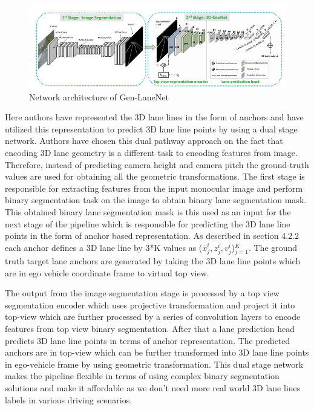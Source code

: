          \begin{figure}[h]
    \centering
    \includegraphics[width=13cm]{images/GenLaneNET.png}
    \caption{Network architecture of Gen-LaneNet \cite{guo2020gen}}
    \end{figure}
         
         Here authors have represented the 3D lane lines in the form of anchors and have utilized this representation to predict 3D lane line points by using a dual stage network. Authors have chosen this dual pathway approach on the fact that encoding 3D lane geometry is a different task to encoding features from image. Therefore, instead of predicting camera height and camera pitch the ground-truth values are used for obtaining all the geometric transformations. 
         The first stage is responsible for extracting features from the input monocular image and perform binary segmentation task on the image to obtain binary lane segmentation mask. This obtained binary lane segmentation mask is this used as an input for the next stage of the pipeline which is responsible for predicting the 3D lane line points in the form of anchor based representation. As described in section 4.2.2 each anchor defines a 3D lane line by 3*K values as ($\overline{x}^{i}_{j},z^{i}_{j},v^{i}_{j}$)$^{K}_{j=1}$. The ground truth target lane anchors are generated by taking the 3D lane line points which are in ego vehicle coordinate frame to virtual top view.
         
         The output from the image segmentation stage is processed by a top view segmentation encoder which uses projective transformation and project it into top-view which are further processed by a series of convolution layers to encode features from top view binary segmentation. After that a lane prediction head predicts 3D lane line points in terms of anchor representation. The predicted anchors are in top-view which can be further transformed into 3D lane line points in ego-vehicle frame by using geometric transformation. This dual stage network makes the pipeline flexible in terms of using complex binary segmentation solutions and make it affordable as we don't need more real world 3D lane lines labels in various driving scenarios.
        
